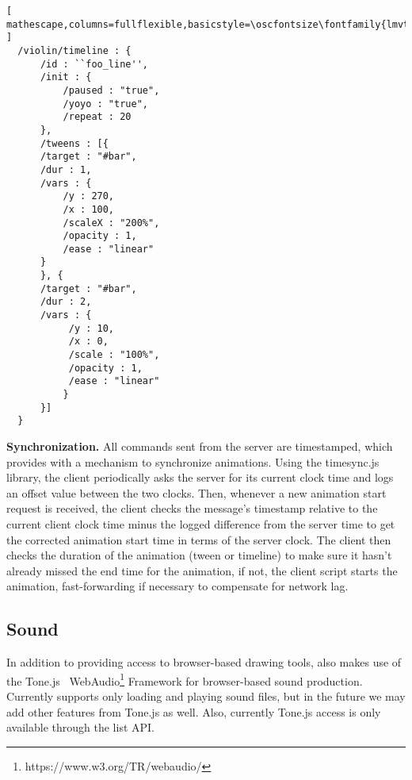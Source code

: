 \begin{minipage}{\linewidth}
\begin{lstlisting}[ mathescape,columns=fullflexible,basicstyle=\oscfontsize\fontfamily{lmvtt}\selectfont ]
  /violin/timeline : {
      /id : ``foo_line'',
      /init : {
          /paused : "true",
          /yoyo : "true",
          /repeat : 20
      },
      /tweens : [{
	  /target : "#bar",
	  /dur : 1,
	  /vars : {
	      /y : 270,
	      /x : 100,
	      /scaleX : "200%",
	      /opacity : 1,
	      /ease : "linear"
	  }
      }, {
	  /target : "#bar",
	  /dur : 2,
	  /vars : {
	       /y : 10,
	       /x : 0,
	       /scale : "100%",
	       /opacity : 1,
	       /ease : "linear"
      	  }
      }]
  }
\end{lstlisting}
\end{minipage}

\medskip
\noindent
\textbf{Synchronization.} 
All commands sent from the server are timestamped, which provides \drawsocket with a mechanism to synchronize animations.
Using the timesync.js library, the client periodically asks the server for its current clock time and logs an offset value between the two clocks.
Then, whenever a new animation start request is received, the client checks the message's timestamp relative to the current client clock time minus the logged difference from the server time to get the corrected animation start time in terms of the server clock.
The client then checks the duration of the animation (tween or timeline) to make sure it hasn't already missed the end time for the animation, if not, the client script starts the animation, fast-forwarding if necessary to compensate for network lag.

\subsection{Sound}\label{sec:sound}
In addition to providing access to browser-based drawing tools, \drawsocket also makes use of the Tone.js~\cite{mann2015interactive} WebAudio\footnote{https://www.w3.org/TR/webaudio/} Framework for browser-based sound production.
Currently \drawsocket supports only loading and playing sound files, but in the future we may add other features from Tone.js as well.
Also, currently Tone.js access is only available through the list API. 

